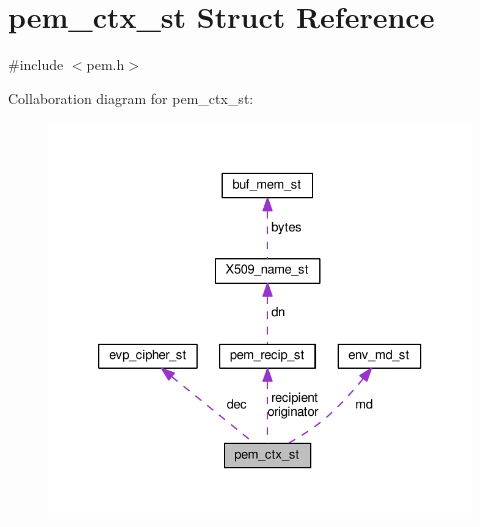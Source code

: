 \hypertarget{structpem__ctx__st}{}\section{pem\+\_\+ctx\+\_\+st Struct Reference}
\label{structpem__ctx__st}


{\ttfamily \#include $<$pem.\+h$>$}



Collaboration diagram for pem\+\_\+ctx\+\_\+st\+:
\nopagebreak
\begin{figure}[H]
\begin{center}
\leavevmode
\includegraphics[width=333pt]{structpem__ctx__st__coll__graph}
\end{center}
\end{figure}
